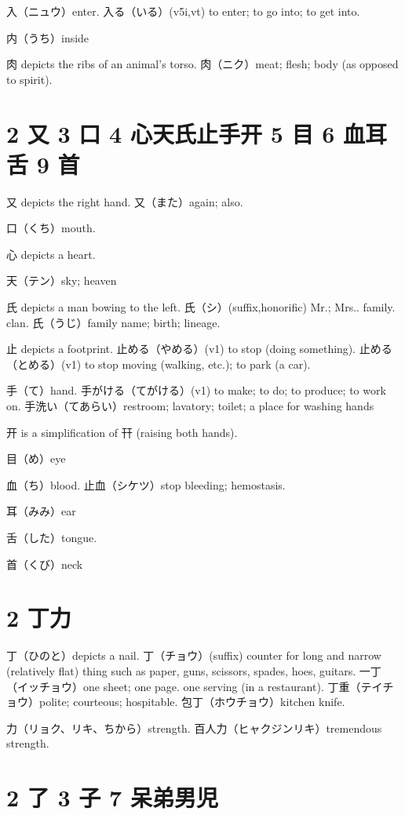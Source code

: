 入（ニュウ）enter.
入る（いる）(v5i,vt)
to enter; to go into; to get into.

内（うち）inside

肉 depicts the ribs of an animal's torso.
肉（ニク）meat; flesh; body (as opposed to spirit).

\section{2 又 3 口 4 心天氏止手开 5 目 6 血耳舌 9 首}

又 depicts the right hand.
又（また）again; also.

口（くち）mouth.

心 depicts a heart.

天（テン）sky; heaven

氏 depicts a man bowing to the left.
氏（シ）(suffix,honorific) Mr.; Mrs.. family. clan.
氏（うじ）family name; birth; lineage.

止 depicts a footprint.
止める（やめる）(v1) to stop (doing something).
止める（とめる）(v1) to stop moving (walking, etc.); to park (a car).

手（て）hand.
手がける（てがける）(v1) to make; to do; to produce; to work on.
手洗い（てあらい）restroom; lavatory; toilet; a place for washing hands

开 is a simplification of 幵 (raising both hands).

目（め）eye

血（ち）blood.
止血（シケツ）stop bleeding; hemostasis.

耳（みみ）ear

舌（した）tongue.

首（くび）neck

\section{2 丁力}

丁（ひのと）depicts a nail.
丁（チョウ）(suffix)
counter for long and narrow (relatively flat) thing
such as paper, guns, scissors, spades, hoes, guitars.
一丁（イッチョウ）one sheet; one page.
one serving (in a restaurant).
丁重（テイチョウ）polite; courteous; hospitable.
包丁（ホウチョウ）kitchen knife.

力（リョク、リキ、ちから）strength.
百人力（ヒャクジンリキ）tremendous strength.

\section{2 了 3 子 7 呆弟男児}

